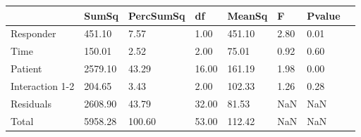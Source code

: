 \begin{tabular}{llllllll}
 & SumSq & PercSumSq & df & MeanSq & F & Pvalue \\ 
 \hline 
Responder & 451.10 & 7.57 & 1.00 & 451.10 & 2.80 & 0.01 \\ 
Time & 150.01 & 2.52 & 2.00 & 75.01 & 0.92 & 0.60 \\ 
Patient & 2579.10 & 43.29 & 16.00 & 161.19 & 1.98 & 0.00 \\ 
Interaction 1-2 & 204.65 & 3.43 & 2.00 & 102.33 & 1.26 & 0.28 \\ 
Residuals & 2608.90 & 43.79 & 32.00 & 81.53 & NaN & NaN \\ 
Total & 5958.28 & 100.60 & 53.00 & 112.42 & NaN & NaN \\ 
\end{tabular} 
